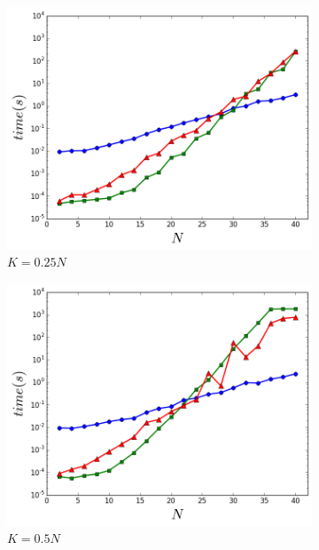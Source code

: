 \begin{figure}[t] 
	\begin{subfigure}[b]{0.3\linewidth}
		\centering
		\includegraphics[width=0.9\linewidth]{Pictures/k1} 
		\caption{$K=0.25N$} 
		\label{fig:fixed_k:a} 
	\end{subfigure}%
	\begin{subfigure}[b]{0.3\linewidth}
		\centering
		\includegraphics[width=0.9\linewidth]{Pictures/k2} 
		\caption{$K=0.5N$} 
		\label{fig:fixed_k:b} 
	\end{subfigure} 
	\begin{center}
	\begin{subfigure}[b]{0.3\linewidth}

\end{subfigure}
\end{center}
\end{figure}
